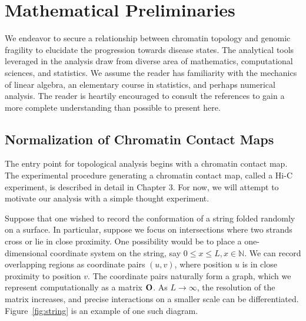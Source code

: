 
\chapter{Mathematical Preliminaries}

We endeavor to secure a relationship between chromatin topology and genomic fragility to elucidate the progression towards
disease states.  The analytical tools leveraged in the analysis draw from diverse area of mathematics, computational sciences,
and statistics.  We assume the reader has familiarity with the mechanics of linear algebra, an elementary course in statistics,
and perhaps numerical analysis.  The reader is heartily encouraged to consult the references to gain a more complete understanding than
possible to present here.

\section*{Normalization of Chromatin Contact Maps}

The entry point for topological analysis begins with a chromatin \gls{contact map}.  The experimental procedure generating a chromatin
contact map, called a Hi-C experiment, is described in detail in Chapter 3.  For now, we will attempt to motivate our
analysis with a simple thought experiment.

Suppose that one wished to record the conformation of a string folded randomly on a surface.  In particular, suppose we focus on intersections
where two strands cross or lie in close proximity.  One possibility would be to place a one-dimensional coordinate system on the string, say
$0 \leq  x \leq  L, x \in \mathbb{N}$.  We can record overlapping regions as coordinate pairs $(u,v)$, where position $u$ is in close proximity
to position $v$.  The coordinate pairs naturally form a graph, which we represent computationally as a matrix $\mathbf{O}$.  As $L \rightarrow \infty$,
the resolution of the matrix increases, and precise interactions on a smaller scale can be differentiated.  Figure~\ref{fig:string} is
an example of one such diagram.


